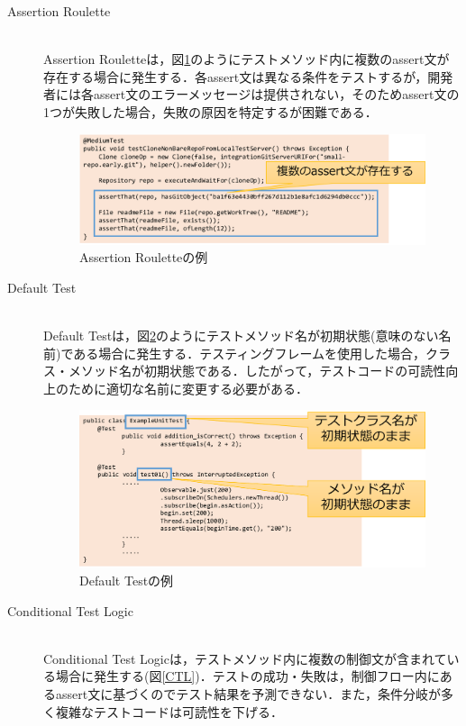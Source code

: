 \documentclass[12pt]{jarticle} %
\begin{document}
\begin{description}
\item[Assertion Roulette]~\\
Assertion Rouletteは，図\ref{AR}のようにテストメソッド内に複数のassert文が存在する場合に発生する．各assert文は異なる条件をテストするが，開発者には各assert文のエラーメッセージは提供されない，そのためassert文の1つが失敗した場合，失敗の原因を特定するが困難である．

\begin{figure}[h]
\begin{center}
\includegraphics[clip,width=15cm]{AR.pdf}
\caption{Assertion Rouletteの例}
\label{AR}
\end{center}
\end{figure}

\item[Default Test]~\\
Default Testは，図\ref{DT}のようにテストメソッド名が初期状態(意味のない名前)である場合に発生する．テスティングフレームを使用した場合，クラス・メソッド名が初期状態である．したがって，テストコードの可読性向上のために適切な名前に変更する必要がある．


\begin{figure}[h]
\begin{center}
\includegraphics[clip,width=15cm]{DT.pdf}
\caption{Default Testの例}
\label{DT}
\end{center}
\end{figure}

\newpage
\item[Conditional Test Logic]~\\
Conditional Test Logicは，テストメソッド内に複数の制御文が含まれている場合に発生する(図\ref{CTL})．テストの成功・失敗は，制御フロー内にあるassert文に基づくのでテスト結果を予測できない．また，条件分岐が多く複雑なテストコードは可読性を下げる．




\end{description}
\end{document}
